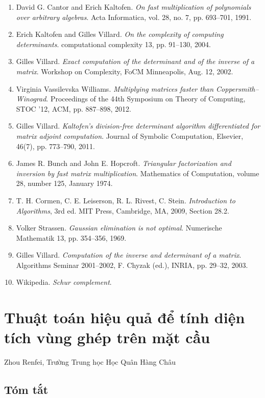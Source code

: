 \documentclass[11pt]{article}
\begin{document}
\begin{enumerate}
  \item David G. Cantor and Erich Kaltofen. \emph{On fast multiplication of
  polynomials over arbitrary algebras}. Acta Informatica, vol. 28, no. 7,
  pp. 693--701, 1991.
  \item Erich Kaltofen and Gilles Villard. \emph{On the complexity of computing
  determinants}. computational complexity 13, pp. 91--130, 2004.
  \item Gilles Villard. \emph{Exact computation of the determinant and of the
  inverse of a matrix}. Workshop on Complexity, FoCM Minneapolis, Aug. 12, 2002.
  \item Virginia Vassilevska Williams. \emph{Multiplying matrices faster than
  Coppersmith--Winograd}. Proceedings of the 44th Symposium on Theory of
  Computing, STOC '12, ACM, pp. 887--898, 2012.
  \item Gilles Villard. \emph{Kaltofen's division-free determinant algorithm
  differentiated for matrix adjoint computation}. Journal of Symbolic
  Computation, Elsevier, 46(7), pp. 773--790, 2011.
  \item James R. Bunch and John E. Hopcroft. \emph{Triangular factorization and
  inversion by fast matrix multiplication}. Mathematics of Computation,
  volume 28, number 125, January 1974.
  \item T. H. Cormen, C. E. Leiserson, R. L. Rivest, C. Stein.
  \emph{Introduction to Algorithms}, 3rd ed. MIT Press, Cambridge, MA, 2009,
  Section 28.2.
  \item Volker Strassen. \emph{Gaussian elimination is not optimal}. Numerische
  Mathematik 13, pp. 354--356, 1969.
  \item Gilles Villard. \emph{Computation of the inverse and determinant of a
  matrix}. Algorithms Seminar 2001--2002, F. Chyzak (ed.), INRIA, pp. 29--32,
  2003.
  \item Wikipedia. \emph{Schur complement}.
\end{enumerate}

\section{Thuật toán hiệu quả để tính diện tích vùng ghép trên mặt cầu}

\begin{center}
Zhou Renfei, Trường Trung học Học Quân Hàng Châu
\end{center}

\subsection*{Tóm tắt}
\end{document}
